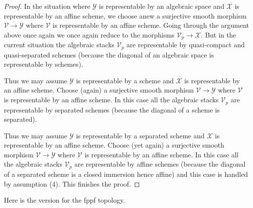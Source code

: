 \begin{proof}
\medskip\noindent
In the situation where $\mathcal{Y}$ is representable by an algebraic
space and $\mathcal{X}$ is representable by an affine scheme, we choose
anew a surjective smooth morphism $\mathcal{V} \to \mathcal{Y}$ where
$\mathcal{V}$ is representable by an affine scheme. Going through the
argument above once again we once again reduce to the morphisms
$\mathcal{V}_p \to \mathcal{X}$. But in the current situation the algebraic
stacks $\mathcal{V}_p$ are representable by quasi-compact and quasi-separated
schemes (because the diagonal of an algebraic space is representable by
schemes).

\medskip\noindent
Thus we may assume $\mathcal{Y}$ is representable by a scheme and
$\mathcal{X}$ is representable by an affine scheme. Choose (again)
a surjective smooth morphism $\mathcal{V} \to \mathcal{Y}$ where
$\mathcal{V}$ is representable by an affine scheme. In this case all
the algebraic stacks $\mathcal{V}_p$ are representable by separated
schemes (because the diagonal of a scheme is separated).

\medskip\noindent
Thus we may assume $\mathcal{Y}$ is representable by a separated scheme and
$\mathcal{X}$ is representable by an affine scheme. Choose (yet again)
a surjective smooth morphism $\mathcal{V} \to \mathcal{Y}$ where
$\mathcal{V}$ is representable by an affine scheme. In this case all
the algebraic stacks $\mathcal{V}_p$ are representable by affine schemes
(because the diagonal of a separated scheme is a closed immersion hence affine)
and this case is handled by assumption (4).
This finishes the proof.
\end{proof}

\noindent
Here is the version for the fppf topology.

